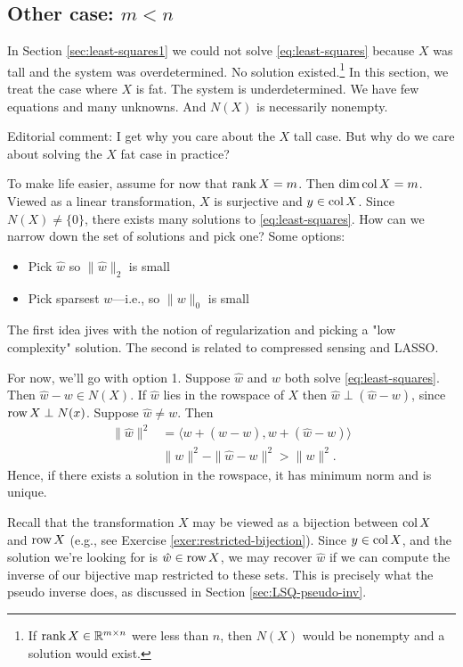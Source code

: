 \subsection{Other case: $m<n$}

In Section \ref{sec:least-squares1} we could not solve \eqref{eq:least-squares} because $X$ was tall and the system was overdetermined. No solution existed.\footnote{If $\textup{rank}\, X\in \mathbb{R}^{m\times n}$ were less than $n$, then $N(X)$ would be nonempty and a solution would exist.} In this section, we treat the case where $X$ is fat. The system is underdetermined. We have few equations and many unknowns. And $N(X)$ is necessarily nonempty. 

Editorial comment: I get why you care about the $X$ tall case. But why do we care about solving the $X$ fat case in practice? 

To make life easier, assume for now that $\textup{rank}\, X = m$. Then $\dim \text{col}\, X = m$. Viewed as a linear transformation, $X$ is surjective and $y\in \text{col}\, X$. Since $N(X) \not= \{0\}$, there exists many solutions to \eqref{eq:least-squares}. How can we narrow down the set of solutions and pick one? Some options:
\begin{itemize}
    \item Pick $\hat w$ so $\|\hat w\|_2$ is small
    \item Pick sparsest $w$---i.e., so $\|w\|_0$ is small
\end{itemize}
The first idea jives with the notion of regularization and picking a "low complexity" solution. The second is related to compressed sensing and LASSO. 

For now, we'll go with option 1. Suppose $\hat w$ and $w$ both solve \eqref{eq:least-squares}. Then $\hat w - w \in N(X)$. If $\hat w$ lies in the rowspace of $X$ then $\hat w \perp (\hat w - w)$, since $\text{row}\, X \perp N(x)$. Suppose $\hat w \not = w$. Then
\begin{align}
  \|\hat w\|^2 & = \langle w + (\hat w - w), w + (\hat w - w)  \rangle\\
  & \|w\|^2 - \|\hat w - w\|^2 > \|w\|^2.
\end{align}
Hence, if there exists a solution in the rowspace, it has minimum norm and is unique. 

Recall that the transformation $X$ may be viewed as a bijection between $\text{col}\, X$ and $\text{row}\, X$ (e.g., see Exercise \ref{exer:restricted-bijection}). Since $y \in \text{col}\, X$, and the solution we're looking for is $\hat w \in \text{row}\, X$, we may recover $\hat w$ if we can compute the inverse of our bijective map restricted to these sets. This is precisely what the pseudo inverse does, as discussed in Section \ref{sec:LSQ-pseudo-inv}. 

